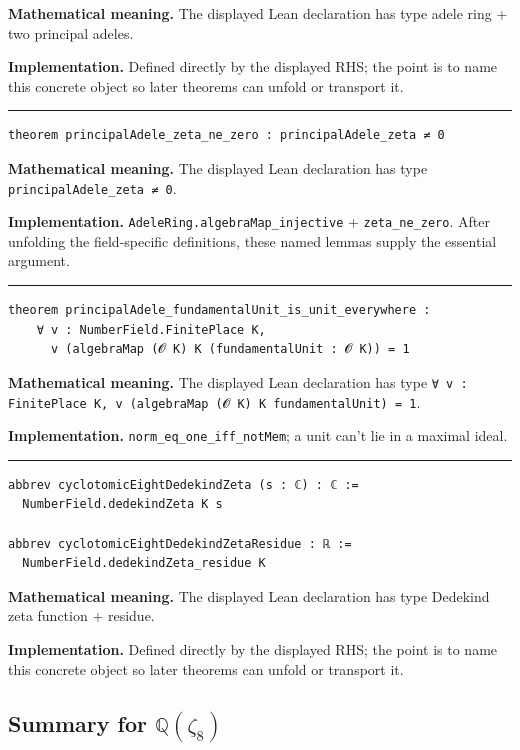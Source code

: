 \documentclass[UTF8,a4paper,11pt,fontset=fandol]{ctexart}
\theoremstyle{definition}
\newcommand{\statementsep}{\par\medskip\hrule\medskip}
\begin{document}
\noindent\textbf{Mathematical meaning.} The displayed Lean declaration has type adele ring + two principal adeles.\par
\noindent\textbf{Implementation.} Defined directly by the displayed RHS; the point is to name this concrete object so later theorems can unfold or transport it.\par
\statementsep
\begin{verbatim}
theorem principalAdele_zeta_ne_zero : principalAdele_zeta ≠ 0
\end{verbatim}
\noindent\textbf{Mathematical meaning.} The displayed Lean declaration has type \texttt{principalAdele\_\allowbreak{}zeta ≠ 0}.\par
\noindent\textbf{Implementation.} \texttt{AdeleRing.\allowbreak{}algebraMap\_\allowbreak{}injective} + \texttt{zeta\_\allowbreak{}ne\_\allowbreak{}zero}. After unfolding the field-specific definitions, these named lemmas supply the essential argument.\par
\statementsep
\begin{verbatim}
theorem principalAdele_fundamentalUnit_is_unit_everywhere :
    ∀ v : NumberField.FinitePlace K,
      v (algebraMap (𝓞 K) K (fundamentalUnit : 𝓞 K)) = 1
\end{verbatim}
\noindent\textbf{Mathematical meaning.} The displayed Lean declaration has type \texttt{∀ v : FinitePlace K, v (algebraMap (𝓞 K) K fundamentalUnit) = 1}.\par
\noindent\textbf{Implementation.} \texttt{norm\_\allowbreak{}eq\_\allowbreak{}one\_\allowbreak{}iff\_\allowbreak{}notMem}; a unit can't lie in a maximal ideal.\par
\statementsep
\begin{verbatim}
abbrev cyclotomicEightDedekindZeta (s : ℂ) : ℂ :=
  NumberField.dedekindZeta K s

abbrev cyclotomicEightDedekindZetaResidue : ℝ :=
  NumberField.dedekindZeta_residue K
\end{verbatim}
\noindent\textbf{Mathematical meaning.} The displayed Lean declaration has type Dedekind zeta function + residue.\par
\noindent\textbf{Implementation.} Defined directly by the displayed RHS; the point is to name this concrete object so later theorems can unfold or transport it.\par

\subsection{Summary for \(\mathbb Q(\zeta_8)\)}
\end{document}
